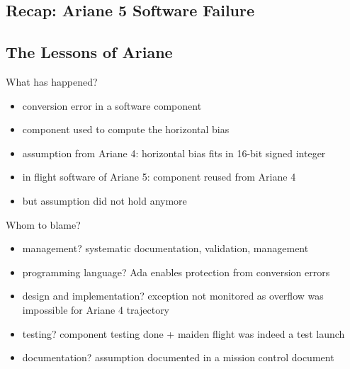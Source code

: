 \subsection{Recap: Ariane 5 Software Failure}
\begin{frame}{\insertsubsection}
	\slideArianeFailure
\end{frame}

\subsection{The Lessons of Ariane}
\begin{frame}{\insertsubsection{} \mytitlesource{\lessonsofariane}}
	\begin{fancycolumns}[widths={25}]
	\nextcolumn
		\begin{example}{What has happened?}
			\begin{itemize}
				\item conversion error in a software component
				\item component used to compute the horizontal bias
				\item assumption from Ariane 4: horizontal bias fits in 16-bit signed integer
				\item in flight software of Ariane 5: component reused from Ariane 4
				\item but assumption did not hold anymore
			\end{itemize}
		\end{example}
		\begin{example}{Whom to blame?}
			\begin{itemize}
				\item management? systematic documentation, validation, management
				\item programming language? Ada enables protection from conversion errors
				\item design and implementation? exception not monitored as overflow was impossible for Ariane 4 trajectory
				\item testing? component testing done + maiden flight was indeed a test launch
				\item documentation? assumption documented in a mission control document
			\end{itemize}
		\end{example}
	\end{fancycolumns}
\end{frame}

